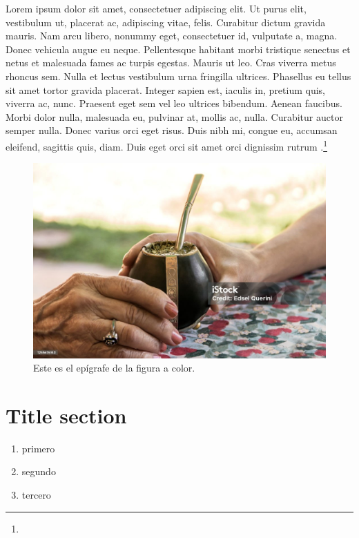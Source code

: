 \documentclass{book}
\begin{document}
Lorem ipsum dolor sit amet, consectetuer adipiscing elit. Ut purus elit, vestibulum ut, placerat ac, adipiscing vitae, felis. Curabitur dictum gravida mauris. Nam arcu libero, nonummy eget, consectetuer id, vulputate a, magna. Donec vehicula augue eu neque. Pellentesque habitant morbi tristique senectus et netus et malesuada fames ac turpis egestas. Mauris ut leo. Cras viverra metus rhoncus sem. Nulla et lectus vestibulum urna fringilla ultrices. Phasellus eu tellus sit amet tortor gravida placerat. Integer sapien est, iaculis in, pretium quis, viverra ac, nunc. Praesent eget sem vel leo ultrices bibendum. Aenean faucibus. Morbi dolor nulla, malesuada eu, pulvinar at, mollis ac, nulla. Curabitur auctor semper nulla. Donec varius orci eget risus. Duis nibh mi, congue eu, accumsan eleifend, sagittis quis, diam. Duis eget orci sit amet orci dignissim rutrum \parencite{@3070-TARKOVSKI1995}.\footnote{\lipsum[3]}

\lipsum[1]

\begin{figure}[!ht]
	\centering
	\includegraphics[width=\textwidth]{imagen1.jpg}
	\caption{Este es el epígrafe de la figura a color.}\label{figura1}
\end{figure}

\section{Title section}

\begin{enumerate}
	\item primero
	\item segundo
	\item tercero
\end{enumerate}
\end{document}
